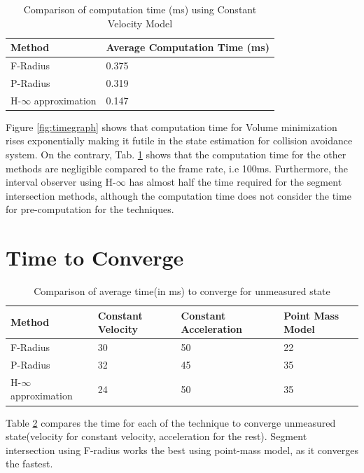 \begin{table}[htbp]
\caption{Comparison of computation time (ms) using Constant Velocity Model\\}
	\centering
	\renewcommand{\arraystretch}{1.1}
	\small	
	\begin{tabular}{l l}
		\toprule 
		\textbf{Method} & \textbf{Average Computation Time (ms)}\\ \midrule
		F-Radius & 0.375\\
		P-Radius &0.319\\
		H-$\infty$ approximation & 0.147\\
		\bottomrule
	\end{tabular}
	\label{tab:comptime}
\end{table}
Figure \ref{fig:timegraph} shows that computation time for Volume minimization rises exponentially making it futile in the state estimation for collision avoidance system. On the contrary, Tab. \ref{tab:comptime} shows that the computation time for the other methods are negligible compared to the frame rate, i.e 100ms. Furthermore, the interval observer using H-$\infty$ has almost half the time required for the segment intersection methods, although the computation time does not consider the time for pre-computation for the techniques.



\section{Time to Converge}
\begin{table}[htbp]
\caption{Comparison of average time(in ms) to converge for unmeasured state\\}
	\centering
	\renewcommand{\arraystretch}{1.1}
	\small	
	\begin{tabular}{l l l l}
		\toprule 
		\textbf{Method} & \textbf{Constant Velocity} & \textbf{Constant Acceleration} & \textbf{Point Mass Model} \\ \midrule
		F-Radius & 30 & 50 & 22\\
		P-Radius & 32 & 45 & 35\\
		H-$\infty$ approximation & 24 & 50 & 35\\
		\bottomrule
	\end{tabular}
	\label{tab:convtime}
\end{table}
Table \ref{tab:convtime} compares the time for each of the technique to converge unmeasured state(velocity for constant velocity, acceleration for the rest). Segment intersection using F-radius works the best using point-mass model, as it converges the fastest.


